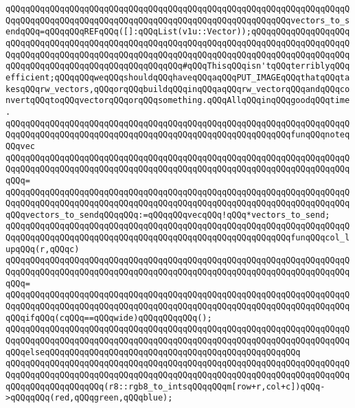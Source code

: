 \newline
\verb|qQQqqQQqqQQqqQQqqQQqqQQqqQQqqQQqqQQqqQQqqQQqqQQqqQQqqQQqqQQqqQQqqQQqqQQqqQQqqQQqqQQqqQQqqQQqqQQqqQQqqQQqqQQqqQQqqQQqqQQqqQQqqQQqvectors_to_sendqQQq=qQQqqQQqREFqQQq([]:qQQqList(v1u::Vector));qQQqqQQqqQQqqQQqqQQqqQQqqQQqqQQqqQQqqQQqqQQqqQQqqQQqqQQqqQQqqQQqqQQqqQQqqQQqqQQqqQQqqQQqqQQqqQQqqQQqqQQqqQQqqQQqqQQqqQQqqQQqqQQqqQQqqQQqqQQqqQQqqQQqqQQqqQQqqQQqqQQqqQQqqQQqqQQqqQQqqQQqqQQqqQQqqQQq#qQQqThisqQQqisn'tqQQqterriblyqQQqefficient;qQQqqQQqweqQQqshouldqQQqhaveqQQqaqQQqPUT_IMAGEqQQqthatqQQqtakesqQQqrw_vectors,qQQqorqQQqbuildqQQqinqQQqaqQQqrw_vectorqQQqandqQQqconvertqQQqtoqQQqvectorqQQqorqQQqsomething.qQQqAllqQQqinqQQqgoodqQQqtime.|\newline
\newline
\verb|qQQqqQQqqQQqqQQqqQQqqQQqqQQqqQQqqQQqqQQqqQQqqQQqqQQqqQQqqQQqqQQqqQQqqQQqqQQqqQQqqQQqqQQqqQQqqQQqqQQqqQQqqQQqqQQqqQQqqQQqqQQqqQQqfunqQQqnoteqQQqvec|\newline
\verb|qQQqqQQqqQQqqQQqqQQqqQQqqQQqqQQqqQQqqQQqqQQqqQQqqQQqqQQqqQQqqQQqqQQqqQQqqQQqqQQqqQQqqQQqqQQqqQQqqQQqqQQqqQQqqQQqqQQqqQQqqQQqqQQqqQQqqQQqqQQqqQQq=|\newline
\verb|qQQqqQQqqQQqqQQqqQQqqQQqqQQqqQQqqQQqqQQqqQQqqQQqqQQqqQQqqQQqqQQqqQQqqQQqqQQqqQQqqQQqqQQqqQQqqQQqqQQqqQQqqQQqqQQqqQQqqQQqqQQqqQQqqQQqqQQqqQQqqQQqvectors_to_sendqQQqqQQq:=qQQqqQQqvecqQQq!qQQq*vectors_to_send;|\newline
\newline
\verb|qQQqqQQqqQQqqQQqqQQqqQQqqQQqqQQqqQQqqQQqqQQqqQQqqQQqqQQqqQQqqQQqqQQqqQQqqQQqqQQqqQQqqQQqqQQqqQQqqQQqqQQqqQQqqQQqqQQqqQQqqQQqqQQqfunqQQqcol_lupqQQq(r,qQQqc)|\newline
\verb|qQQqqQQqqQQqqQQqqQQqqQQqqQQqqQQqqQQqqQQqqQQqqQQqqQQqqQQqqQQqqQQqqQQqqQQqqQQqqQQqqQQqqQQqqQQqqQQqqQQqqQQqqQQqqQQqqQQqqQQqqQQqqQQqqQQqqQQqqQQqqQQq=|\newline
\verb|qQQqqQQqqQQqqQQqqQQqqQQqqQQqqQQqqQQqqQQqqQQqqQQqqQQqqQQqqQQqqQQqqQQqqQQqqQQqqQQqqQQqqQQqqQQqqQQqqQQqqQQqqQQqqQQqqQQqqQQqqQQqqQQqqQQqqQQqqQQqqQQqifqQQq(cqQQq==qQQqwide)qQQqqQQqqQQq();|\newline
\verb|qQQqqQQqqQQqqQQqqQQqqQQqqQQqqQQqqQQqqQQqqQQqqQQqqQQqqQQqqQQqqQQqqQQqqQQqqQQqqQQqqQQqqQQqqQQqqQQqqQQqqQQqqQQqqQQqqQQqqQQqqQQqqQQqqQQqqQQqqQQqqQQqelseqQQqqQQqqQQqqQQqqQQqqQQqqQQqqQQqqQQqqQQqqQQqqQQqqQQq|\newline
\verb|qQQqqQQqqQQqqQQqqQQqqQQqqQQqqQQqqQQqqQQqqQQqqQQqqQQqqQQqqQQqqQQqqQQqqQQqqQQqqQQqqQQqqQQqqQQqqQQqqQQqqQQqqQQqqQQqqQQqqQQqqQQqqQQqqQQqqQQqqQQqqQQqqQQqqQQqqQQqqQQq(r8::rgb8_to_intsqQQqqQQqm[row+r,col+c])qQQq->qQQqqQQq(red,qQQqgreen,qQQqblue);|\newline
